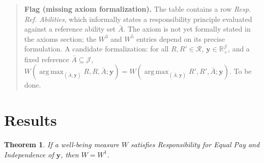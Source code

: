 \documentclass[12pt,thmsb]{article}
\DeclareMathOperator*{\argmax}{arg\,max}
\newtheorem{theorem}{Theorem}
\begin{document}
\begin{quote}
\textbf{Flag (missing axiom formalization).} The table contains a row \emph{Resp. Ref. Abilities}, which informally states a responsibility principle evaluated against a reference ability set $\bar A$. The axiom is not yet formally stated in the axioms section; the $W^3$ and $W^5$ entries depend on its precise formulation. A candidate formalization: for all $R,R'\in\mathcal R$, $\mathbf y\in\mathbb R_+^{\mathcal J}$, and a fixed reference $\bar A\subseteq\mathcal J$, $W(\argmax_{(\bar A,\mathbf y)}R,R,\bar A;\mathbf y)=W(\argmax_{(\bar A,\mathbf y)}R',R',\bar A;\mathbf y)$. To be done.
\end{quote}

\section{Results}

\begin{theorem}
If a well-being measure $W$ satisfies Responsibility for Equal Pay and Independence of $\mathbf{y}$, then $W=W^1$.
\end{theorem}
\end{document}
